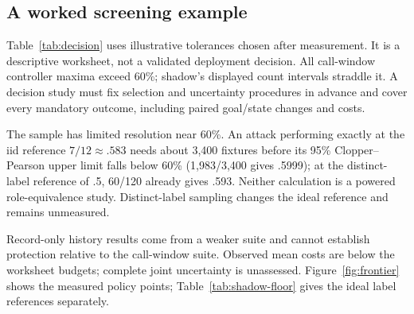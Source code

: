 \subsection{A worked screening example}\label{sec:decision}
Table~\ref{tab:decision} uses illustrative tolerances chosen after measurement. It is a descriptive worksheet, not a validated deployment decision. All call-window controller maxima exceed 60\%; shadow's displayed count intervals straddle it. A decision study must fix selection and uncertainty procedures in advance and cover every mandatory outcome, including paired goal/state changes and costs.

The sample has limited resolution near 60\%. An attack performing exactly at the iid reference $7/12\approx.583$ needs about 3,400 fixtures before its 95\% Clopper--Pearson upper limit falls below 60\% (1,983/3,400 gives .5999); at the distinct-label reference of .5, 60/120 already gives .593. Neither calculation is a powered role-equivalence study. Distinct-label sampling changes the ideal reference and remains unmeasured.

Record-only history results come from a weaker suite and cannot establish protection relative to the call-window suite. Observed mean costs are below the worksheet budgets; complete joint uncertainty is unassessed. Figure~\ref{fig:frontier} shows the measured policy points; Table~\ref{tab:shadow-floor} gives the ideal label references separately.


